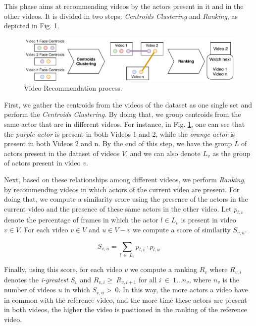 This phase aims at recommending videos by the actors present in it and in the other videos.
It is divided in two steps: \emph{Centroids Clustering} and \emph{Ranking}, as depicted in Fig. \ref{fig:video_recommendation}.

\begin{figure}[!ht]
  \centering
  \includegraphics[width=0.8\linewidth]{img/ism/video_recommendation.pdf}
  \caption{Video Recommendation process.}
  \label{fig:video_recommendation}
\end{figure}

First, we gather the centroids from the videos of the dataset as one single set and perform the \textit{Centroids Clustering}.
By doing that, we group centroids from the same actor that are in different videos. For instance, in Fig. \ref{fig:video_recommendation}, one can see that the \emph{purple actor} is present in both Videos 1 and 2, while the \emph{orange actor} is present in both Videos 2 and n. By the end of this step, we have the group $L$ of actors present in the dataset of videos $V$, and we can also denote $L_v$ as the group of actors present in video $v$.

Next, based on these relationships among different videos, we perform \textit{Ranking}, by recommending videos in which actors of the current video are present. 
For doing that, we compute a similarity score using the presence of the actors in the current video and the presence of these same actors in the other video.
Let $p_{l,v}$ denote the percentage of frames in which the actor $l \in L_v$ is present in video $v \in V$. For each video $v \in V$ and $u \in V-v$ we compute a score of similarity $S_{v,u}$.

\vspace{-1em}
\begin{equation}
  S_{v,u} = \sum_{l~\in~L_v}{p_{l,v}\cdot{p_{l,u}}}
\end{equation}

Finally, using this score, for each video $v$ we compute a ranking $R_{v}$ where $R_{v,i}$ denotes the \emph{i-greatest} $S_v$ and $R_{v,i}\ge~R_{v,i+1}$ for all $i~\in~1...n_v$, where $n_v$ is the number of videos $u$ in which $S_{v,u}>~0$. 
In this way, the more actors a video have in common with the reference video, and the more time these actors are present in both videos, the higher the video is positioned in the ranking of the reference video.  


